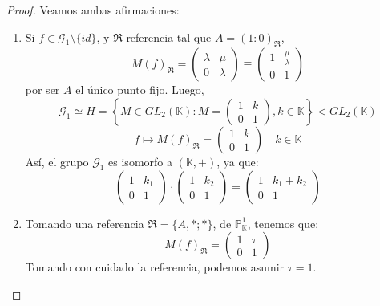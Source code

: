 \begin{proof}
    Veamos ambas afirmaciones:
    \begin{enumerate}
        \item Si $f \in \mathcal{G}_1 \setminus \{id\}$, y $\mathfrak{R}$ referencia tal que $A = (1:0)_\mathfrak{R}$, 
    \[
        M(f)_\mathfrak{R} = \begin{pmatrix}
            \lambda & \mu \\
            0 & \lambda
        \end{pmatrix} \equiv \begin{pmatrix}
            1 & \frac{\mu}{\lambda} \\
            0 & 1
        \end{pmatrix}
    \]
    por ser $A$ el único punto fijo. Luego, 
    \[
        \mathcal{G}_1 \simeq H = \left\{ M \in GL_2(\mathbb{K}) : M = \begin{pmatrix}
            1 & k \\
            0 & 1
        \end{pmatrix}, k \in \mathbb{K} \right\} < GL_2(\mathbb{K}) 
    \]
    \[
        f \mapsto M(f)_\mathfrak{R} = \begin{pmatrix}
            1 & k \\
            0 & 1
        \end{pmatrix} \quad k \in \mathbb{K}
    \]
    Así, el grupo $\mathcal{G}_1$ es isomorfo a $(\mathbb{K}, +)$, ya que:
    \[
        \begin{pmatrix}
            1 & k_1 \\
            0 & 1
        \end{pmatrix}
        \cdot
        \begin{pmatrix}
            1 & k_2 \\
            0 & 1
        \end{pmatrix} =
        \begin{pmatrix}
            1 & k_1 + k_2 \\
            0 & 1
        \end{pmatrix}
    \]
    \item Tomando una referencia $\mathfrak{R} = \{A, *; *\}$, de $\mathbb{P}^1_{\mathbb{K}}$, tenemos que:
    \[
    M(f)_{\mathfrak{R}} =
    \begin{pmatrix}
        1 & \tau \\
        0 & 1
    \end{pmatrix}
    \]
    Tomando con cuidado la referencia, podemos asumir $\tau = 1$.\\

\end{enumerate}
\end{proof}
